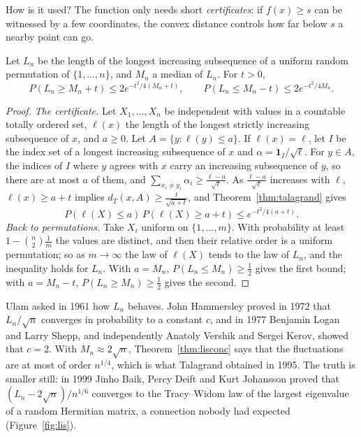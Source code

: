 How is it used? The function only needs short \emph{certificates}: if $f(x)\ge s$ can be witnessed by a few coordinates, the convex distance controls how far below $s$
a nearby point can go.

\begin{theorem}\label{thm:lisconc}
Let $L_n$ be the length of the longest increasing subsequence of a uniform random permutation of $\{1,\dots,n\}$, and $M_n$ a median of $L_n$. For $t>0$,
\[
P(L_n\ge M_n+t)\le2e^{-t^2/4(M_n+t)},\qquad P(L_n\le M_n-t)\le2e^{-t^2/4M_n}.
\]
\end{theorem}
\begin{proof}
\emph{The certificate.} Let $X_1,\dots,X_n$ be independent with values in a countable totally ordered set, $\ell(x)$ the length of the longest strictly increasing subsequence of
$x$, and $a\ge0$. Let $A=\{y:\ell(y)\le a\}$. If $\ell(x)=\ell$, let $I$ be the index set of a longest increasing subsequence of $x$ and $\alpha=\mathbf 1_I/\sqrt\ell$. For $y\in A$, the indices of $I$
where $y$ agrees with $x$ carry an increasing subsequence of $y$, so there are at most $a$ of them, and $\sum_{x_i\ne y_i}\alpha_i\ge\frac{\ell-a}{\sqrt\ell}$. As $\frac{\ell-a}{\sqrt\ell}$ increases with $\ell$,
$\ell(x)\ge a+t$ implies $d_T(x,A)\ge\frac t{\sqrt{a+t}}$, and Theorem~\ref{thm:talagrand} gives
\[
P(\ell(X)\le a)\,P(\ell(X)\ge a+t)\le e^{-t^2/4(a+t)}.
\]
\emph{Back to permutations.} Take $X_i$ uniform on $\{1,\dots,m\}$. With probability at least $1-\binom n2\frac1m$ the values are distinct, and then their relative order is a uniform permutation;
so as $m\to\infty$ the law of $\ell(X)$ tends to the law of $L_n$, and the inequality holds for $L_n$. With $a=M_n$, $P(L_n\le M_n)\ge\frac12$ gives the first bound; with
$a=M_n-t$, $P(L_n\ge M_n)\ge\frac12$ gives the second.
\end{proof}

Ulam asked in 1961 how $L_n$ behaves. John Hammersley proved in 1972 that $L_n/\sqrt n$ converges in probability to a constant $c$, and in 1977 Benjamin Logan and Larry Shepp, and
independently Anatoly Vershik and Sergei Kerov, showed that $c=2$. With $M_n\approx2\sqrt n$, Theorem~\ref{thm:lisconc} says that the fluctuations are at most of order
$n^{1/4}$, which is what Talagrand obtained in 1995. The truth is smaller still: in 1999 Jinho Baik, Percy Deift and Kurt Johansson proved that
$(L_n-2\sqrt n)/n^{1/6}$ converges to the Tracy--Widom law of the largest eigenvalue of a random Hermitian matrix, a connection nobody had expected (Figure~\ref{fig:lis}).

